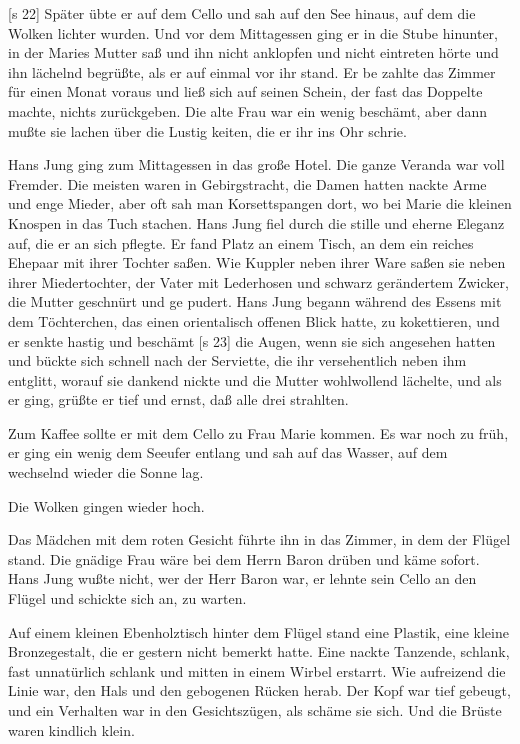 [s 22]
Später übte er auf dem Cello und sah auf den
See hinaus, auf dem die Wolken lichter wurden.
Und vor dem Mittagessen ging er in die Stube
hinunter, in der Maries Mutter saß und ihn nicht
anklopfen und nicht eintreten hörte und ihn lächelnd
begrüßte, als er auf einmal vor ihr stand. Er be­
zahlte das Zimmer für einen Monat voraus und ließ
sich auf seinen Schein, der fast das Doppelte machte,
nichts zurückgeben. Die alte Frau war ein wenig
beschämt, aber dann mußte sie lachen über die Lustig­
keiten, die er ihr ins Ohr schrie.

Hans Jung ging zum Mittagessen in das große
Hotel. Die ganze Veranda war voll Fremder. Die
meisten waren in Gebirgstracht, die Damen hatten
nackte Arme und enge Mieder, aber oft sah man
Korsettspangen dort, wo bei Marie die kleinen
Knospen in das Tuch stachen. Hans Jung fiel durch
die stille und eherne Eleganz auf, die er an sich
pflegte. Er fand Platz an einem Tisch, an dem ein
reiches Ehepaar mit ihrer Tochter saßen. Wie
Kuppler neben ihrer Ware saßen sie neben ihrer
Miedertochter, der Vater mit Lederhosen und schwarz­
gerändertem Zwicker, die Mutter geschnürt und ge­
pudert. Hans Jung begann während des Essens mit
dem Töchterchen, das einen orientalisch offenen Blick
hatte, zu kokettieren, und er senkte hastig und beschämt
[s 23]
die Augen, wenn sie sich angesehen hatten und bückte
sich schnell nach der Serviette, die ihr versehentlich
neben ihm entglitt, worauf sie dankend nickte und
die Mutter wohlwollend lächelte, und als er ging,
grüßte er tief und ernst, daß alle drei strahlten.

Zum Kaffee sollte er mit dem Cello zu Frau
Marie kommen. Es war noch zu früh, er ging ein
wenig dem Seeufer entlang und sah auf das Wasser,
auf dem wechselnd wieder die Sonne lag.

Die Wolken gingen wieder hoch.

Das Mädchen mit dem roten Gesicht führte
ihn in das Zimmer, in dem der Flügel stand. Die
gnädige Frau wäre bei dem Herrn Baron drüben
und käme sofort. Hans Jung wußte nicht, wer der
Herr Baron war, er lehnte sein Cello an den Flügel
und schickte sich an, zu warten.

Auf einem kleinen Ebenholztisch hinter dem
Flügel stand eine Plastik, eine kleine Bronzegestalt,
die er gestern nicht bemerkt hatte. Eine nackte
Tanzende, schlank, fast unnatürlich schlank und mitten
in einem Wirbel erstarrt. Wie aufreizend die Linie
war, den Hals und den gebogenen Rücken herab.
Der Kopf war tief gebeugt, und ein Verhalten war
in den Gesichtszügen, als schäme sie sich. Und die
Brüste waren kindlich klein.

